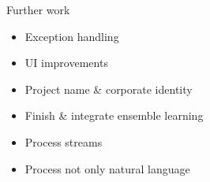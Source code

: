 \begin{frame}{Further work}
	\begin{itemize}
		\item Exception handling
		\item UI improvements
		\item Project name \& corporate identity
		\item Finish \& integrate ensemble learning
		\item Process streams
		\item Process not only natural language
	\end{itemize}
\end{frame}
